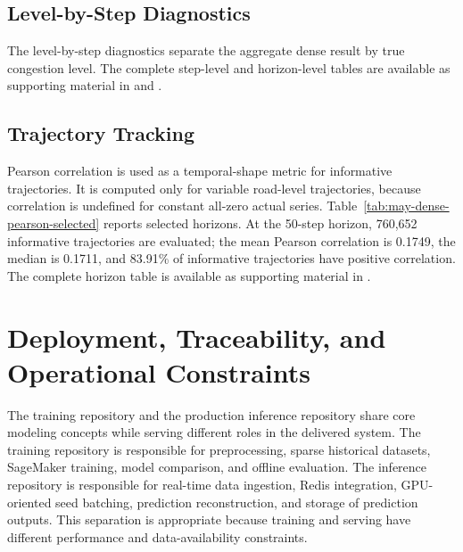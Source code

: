 \documentclass[11pt, a4paper]{article}
\begin{document}
\subsection{Level-by-Step Diagnostics}

The level-by-step diagnostics separate the aggregate dense result by true congestion level. The complete step-level and horizon-level tables are available as supporting material in  and .

\subsection{Trajectory Tracking}

Pearson correlation is used as a temporal-shape metric for informative trajectories. It is computed only for variable road-level trajectories, because correlation is undefined for constant all-zero actual series. Table~\ref{tab:may-dense-pearson-selected} reports selected horizons. At the 50-step horizon, 760,652 informative trajectories are evaluated; the mean Pearson correlation is 0.1749, the median is 0.1711, and 83.91\% of informative trajectories have positive correlation. The complete horizon table is available as supporting material in .

\begin{table}[htbp]
\centering
\caption{Selected trajectory Pearson metrics by horizon. Complete data are available in \texttt{may\_dense\_pearson\_by\_horizon\_all.csv}.}
\label{tab:may-dense-pearson-selected}
{%
%
}
\end{table}

\section{Deployment, Traceability, and Operational Constraints}

The training repository and the production inference repository share core modeling concepts while serving different roles in the delivered system. The training repository is responsible for preprocessing, sparse historical datasets, SageMaker training, model comparison, and offline evaluation. The inference repository is responsible for real-time data ingestion, Redis integration, GPU-oriented seed batching, prediction reconstruction, and storage of prediction outputs. This separation is appropriate because training and serving have different performance and data-availability constraints.
\end{document}
